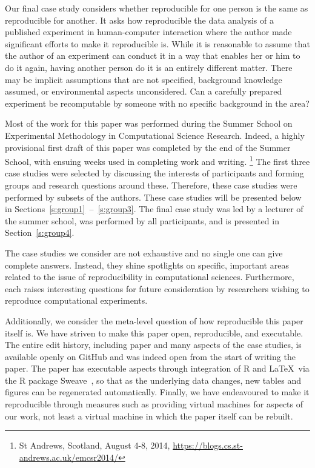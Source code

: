 Our final case study considers whether reproducible for one person is the same
as reproducible for another. It asks how reproducible the data analysis of a
published experiment in human-computer interaction where the author made
significant efforts to make it reproducible is. While it is reasonable to assume
that the author of an experiment can conduct it in a way that enables her or him
to do it again, having another person do it is an entirely different matter.
There may be implicit assumptions that are not specified, background knowledge
assumed, or environmental aspects unconsidered. Can a carefully prepared
experiment be recomputable by someone with no specific background in the area?

Most of the work for this paper was performed during the Summer School on
Experimental Methodology in Computational Science Research. Indeed, a highly
provisional first draft of this paper was completed by the end of the Summer
School, with ensuing weeks used in completing work and writing.  \footnote{St
Andrews, Scotland, August 4-8, 2014,
\url{https://blogs.cs.st-andrews.ac.uk/emcsr2014/}} The first three case studies
were selected by discussing the interests of participants and forming groups
and research questions around these. Therefore, these case studies were
performed by subsets of the authors. These case studies will be
presented below in Sections~\ref{s:group1}~--~\ref{s:group3}. The final case
study was led by a lecturer of the summer school, was performed by all
participants, and is presented in Section~\ref{s:group4}.

The case studies we consider are not exhaustive and no single one can give
complete answers. Instead, they shine spotlights on specific, important areas
related to the issue of reproducibility in computational sciences. Furthermore,
each raises interesting questions for future consideration by researchers
wishing to reproduce computational experiments.

Additionally, we consider the meta-level question of how reproducible this paper
itself is.  We have striven to make this paper open, reproducible, and
executable.
The entire edit history, including paper and many aspects of the
case studies, is available openly on GitHub and was indeed open from the start
of writing the paper.  The paper has executable aspects through integration of R
and \LaTeX\ via the R package Sweave~\cite{sweave}, so that as the underlying
data changes, new tables and figures can be regenerated automatically. Finally,
we have endeavoured to make it reproducible through measures such as providing
virtual machines for aspects of our work, not least a virtual machine in which
the paper itself can be rebuilt.

